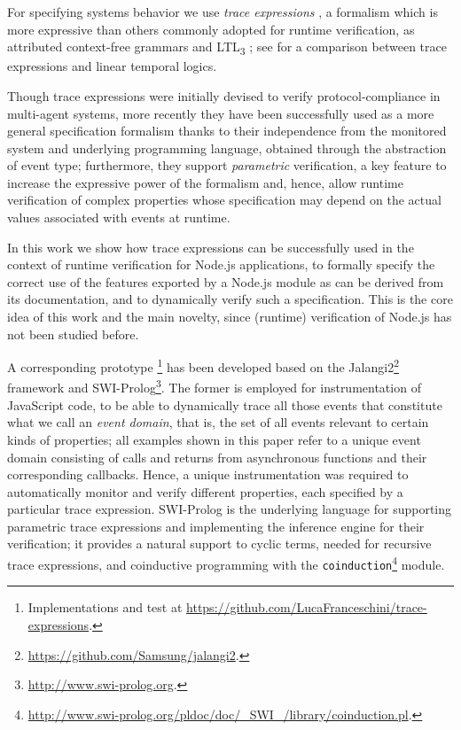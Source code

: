 For specifying systems behavior we use \emph{trace expressions} \cite{ancona2016comparing}, a formalism which is more expressive than others
commonly adopted for runtime verification, as
attributed context-free grammars \cite{de2014combining} and LTL\textsubscript{3} \cite{ltl3}; see \cite{AnconaFM16} for a comparison between trace expressions and linear temporal logics.

Though trace expressions were initially devised to verify protocol-compliance in multi-agent systems, more recently they have been successfully
used as a more general specification formalism \cite{ParametricJava17, TowardsIoT17} thanks to their independence from the monitored system and underlying programming language, obtained through the abstraction of event type;
furthermore, they support \emph{parametric} verification, a key feature to increase the expressive power of the formalism and, hence, allow runtime verification of complex properties whose specification may depend on the actual values associated with events at runtime.

In this work we show how trace expressions can be successfully used in the context of runtime verification for
Node.js applications, to formally specify the correct use of the features exported by a Node.js module as
can be derived from its documentation, and to dynamically verify such a specification.
This is the core idea of this work and the main novelty, since (runtime) verification of Node.js has not been studied before.

A corresponding prototype
\footnote{Implementations and test at \url{https://github.com/LucaFranceschini/trace-expressions}.}
has been developed based on the Jalangi2\footnote{\url{https://github.com/Samsung/jalangi2}.}
framework and SWI-Prolog\footnote{\url{http://www.swi-prolog.org}.}.
The former is employed for instrumentation of JavaScript code, to be able
to dynamically trace all those events that constitute what we call an \emph{event domain}, that is, the set
of all events relevant to certain kinds of properties;
all examples shown in this paper refer to a unique event domain consisting of calls and returns
from asynchronous functions and their corresponding callbacks. Hence, a unique instrumentation
was required to automatically monitor and verify different properties, each specified by a particular trace expression.
SWI-Prolog is the underlying language for supporting parametric
trace expressions and implementing the inference engine for their verification; it provides
a natural support to cyclic terms, needed for recursive trace expressions, and coinductive
programming with the \lstinline{coinduction}\footnote{\url{http://www.swi-prolog.org/pldoc/doc/_SWI_/library/coinduction.pl}.}
module. 

